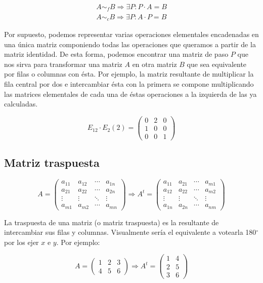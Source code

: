 \[
	\begin{array}{c}
	A \sim_f B \Rightarrow \exists P : P \cdot A = B \\
	A \sim_c B \Rightarrow \exists P : A \cdot P = B
	\end{array}
\]

Por supuesto, podemos representar varias operaciones elementales encadenadas en una única matriz componiendo todas las operaciones que queramos a partir de la matriz identidad.
De esta forma, podemos encontrar una matriz de paso $P$ que nos sirva para transformar una matriz $A$ en otra matriz $B$ que sea equivalente por filas o columnas con ésta.
Por ejemplo, la matriz resultante de multiplicar la fila central por dos e intercambiar ésta con la primera se compone multiplicando las matrices elementales de cada una de éstas operaciones a la izquierda de las ya calculadas.

\[
	E_{12} \cdot E_{2}(2) =
	\begin{pmatrix}
		0 & 2 & 0 \\
		1 & 0 & 0 \\
		0 & 0 & 1
	\end{pmatrix}
\]

\subsection{Matriz traspuesta}\label{matriz-traspuesta}

\[
	A =
	\begin{pmatrix}
		a_{11} & a_{12} & \cdots & a_{1n} \\
		a_{21} & a_{22} & \cdots & a_{2n} \\
		\vdots & \vdots & \ddots & \vdots \\
		a_{m1} & a_{m2} & \cdots & a_{mn}
	\end{pmatrix}
	\Rightarrow A^t =
	\begin{pmatrix}
		a_{11} & a_{21} & \cdots & a_{m1} \\
		a_{12} & a_{22} & \cdots & a_{m2} \\
		\vdots & \vdots & \ddots & \vdots \\
		a_{1n} & a_{2n} & \cdots & a_{nm}
	\end{pmatrix}
\]

La traspuesta de una matriz (o matriz traspuesta) es la resultante de intercambiar sus filas y columnas.
Visualmente sería el equivalente a votearla 180$^\circ$ por los ejer $x$ e $y$.
Por ejemplo:

\[
	A =
	\begin{pmatrix}
		1 & 2 & 3 \\
		4 & 5 & 6
	\end{pmatrix}
	\Rightarrow A^t =
	\begin{pmatrix}
		1 & 4 \\
		2 & 5 \\
		3 & 6
	\end{pmatrix}
\]


